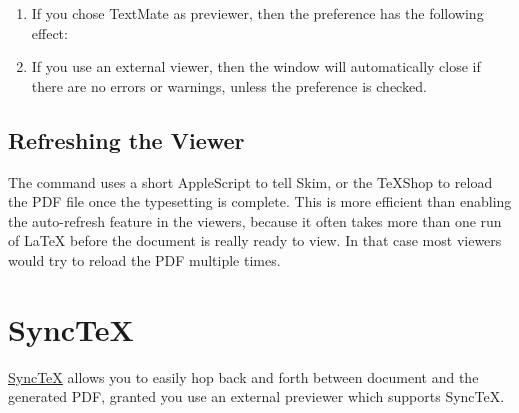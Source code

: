 \documentclass[11pt, x11names]{article}
\begin{document}
\begin{enumerate}

  \item If you chose TextMate as previewer, then the  preference has the following effect:


  \item If you use an external viewer, then the  window will automatically close if there are no errors or warnings, unless the  preference is checked.

\end{enumerate}

\subsection{Refreshing the Viewer}

The  command uses a short AppleScript to tell Skim, or the TeXShop to reload the PDF file once the typesetting is complete. This is more efficient than enabling the auto-refresh feature in the viewers, because it often takes more than one run of LaTeX before the document is really ready to view. In that case most viewers would try to reload the PDF multiple times.

\section{SyncTeX}

\href{http://mactex-wiki.tug.org/wiki/index.php/SyncTeX}{SyncTeX} allows you to easily hop back and forth between document and the generated PDF, granted you use an external previewer which supports SyncTeX.
\end{document}
